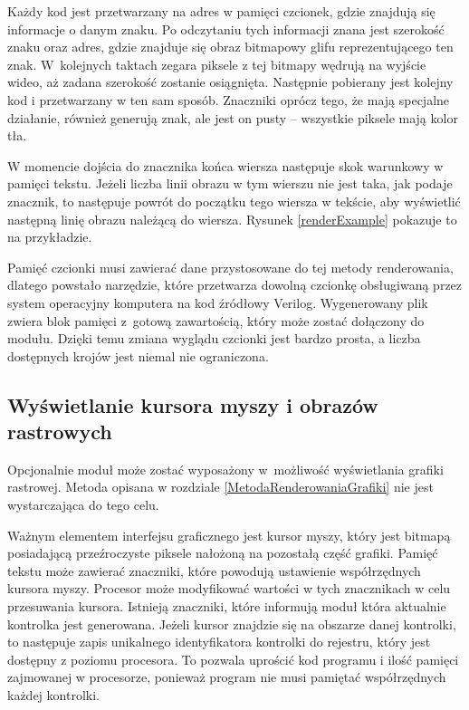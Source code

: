 Każdy kod jest przetwarzany na adres w pamięci czcionek, gdzie znajdują się informacje o danym znaku. Po odczytaniu tych informacji znana jest szerokość znaku oraz adres, gdzie znajduje się obraz bitmapowy glifu reprezentującego ten znak. W~kolejnych taktach zegara piksele z tej bitmapy wędrują na wyjście wideo, aż zadana szerokość zostanie osiągnięta. Następnie pobierany jest kolejny kod i przetwarzany w ten sam sposób. Znaczniki oprócz tego, że mają specjalne działanie, również generują znak, ale jest on pusty -- wszystkie piksele mają kolor tła.

W momencie dojścia do znacznika końca wiersza następuje skok warunkowy w pamięci tekstu. Jeżeli liczba linii obrazu w tym wierszu nie jest taka, jak podaje znacznik, to następuje powrót do początku tego wiersza w tekście, aby wyświetlić następną linię obrazu należącą do wiersza. Rysunek \ref{renderExample} pokazuje to na przykładzie.

Pamięć czcionki musi zawierać dane przystosowane do tej metody renderowania, dlatego powstało narzędzie, które przetwarza dowolną czcionkę obsługiwaną przez system operacyjny komputera na kod źródłowy Verilog. Wygenerowany plik zwiera blok pamięci z~gotową zawartością, który może zostać dołączony do modułu. Dzięki temu zmiana wyglądu czcionki jest bardzo prosta, a liczba dostępnych krojów jest niemal nie ograniczona.


\subsection{Wyświetlanie kursora myszy i obrazów rastrowych}

Opcjonalnie moduł może zostać wyposażony w~możliwość wyświetlania grafiki rastrowej. Metoda opisana w rozdziale \ref{MetodaRenderowaniaGrafiki} nie jest wystarczająca do tego celu.


Ważnym elementem interfejsu graficznego jest kursor myszy, który jest bitmapą posiadającą przeźroczyste piksele nałożoną na pozostałą część grafiki. Pamięć tekstu może zawierać znaczniki, które powodują ustawienie współrzędnych kursora myszy. Procesor może modyfikować wartości w tych znacznikach w celu przesuwania kursora. Istnieją znaczniki, które informują moduł która aktualnie kontrolka jest generowana. Jeżeli kursor znajdzie się na obszarze danej kontrolki, to następuje zapis unikalnego identyfikatora kontrolki do rejestru, który jest dostępny z poziomu procesora. To pozwala uprościć kod programu i ilość pamięci zajmowanej w procesorze, ponieważ program nie musi pamiętać współrzędnych każdej kontrolki.


